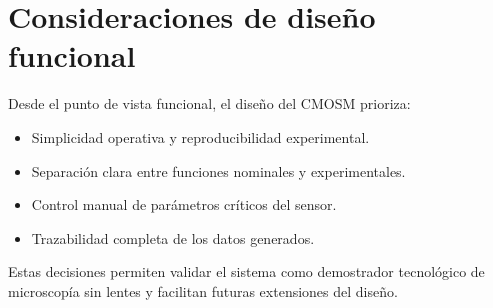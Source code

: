 \section{Consideraciones de diseño funcional}

Desde el punto de vista funcional, el diseño del CMOSM prioriza:

\begin{itemize}
    \item Simplicidad operativa y reproducibilidad experimental.
    \item Separación clara entre funciones nominales y experimentales.
    \item Control manual de parámetros críticos del sensor.
    \item Trazabilidad completa de los datos generados.
\end{itemize}

Estas decisiones permiten validar el sistema como demostrador tecnológico de
microscopía sin lentes y facilitan futuras extensiones del diseño.
